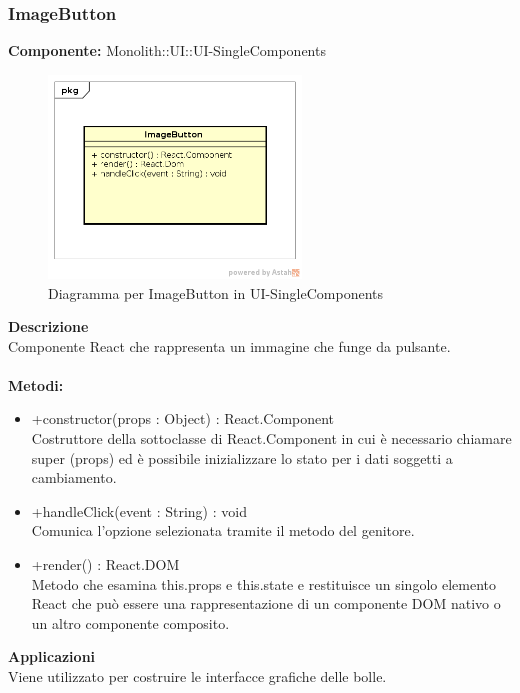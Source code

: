 \subsubsection{ImageButton}
\textbf{Componente:}  Monolith::UI::UI-SingleComponents\\
   \FloatBarrier
   \begin{figure}[ht]
   \centering
   \includegraphics[width=0.6\textwidth]{img/single-ImageButton}
   \caption{{Diagramma per ImageButton in UI-SingleComponents}}
\end{figure}
\FloatBarrier
\textbf{Descrizione}\\
Componente React che rappresenta un immagine che funge da pulsante. \\\\
\textbf{Metodi:} \begin{itemize}\item +constructor(props : Object) : React.Component \\Costruttore della sottoclasse di React.Component in cui è necessario chiamare super (props) ed è possibile inizializzare lo stato per i dati soggetti a cambiamento.\item +handleClick(event : String) : void  \\Comunica l’opzione selezionata tramite il metodo del genitore. \item +render() : React.DOM \\Metodo che esamina this.props e this.state e restituisce un singolo elemento React che può essere una rappresentazione di un componente DOM nativo o un altro componente composito.\end{itemize} 


\textbf{Applicazioni}\\
Viene utilizzato per costruire le interfacce grafiche delle bolle. 


\clearpage

